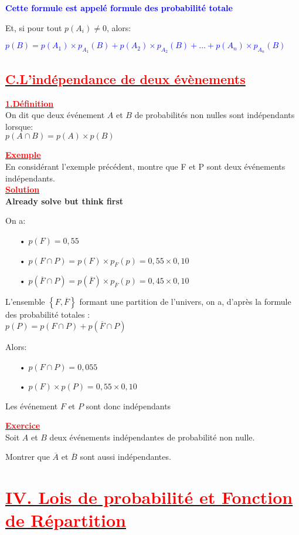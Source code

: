 \documentclass[12pt]{article}
\begin{document}
\textbf{\textcolor{blue}{Cette formule est appelé formule des probabilité totale}}

Et, si pour tout $p(A_{i}) \neq 0$, alors:

\textcolor{blue}{$p(B)=p(A_{1})\times p_{A_{1}}(B)+p(A_{2})\times p_{A_{2}}(B)+...+p(A_{n})\times p_{A_{n}}(B)$}
\subsection*{\underline{\textbf{\textcolor{red}{C.L'indépendance de deux évènements}}}}
\underline{\textbf{\textcolor{red}{1.Définition}}}\\
On dit que deux événement $A$ et $B$ de probabilités non nulles sont indépendants lorsque:\\
$p(A\cap B)=p(A)\times p(B)$

\underline{\textbf{\textcolor{red}{Exemple}}}\\
En considérant l'exemple précédent, montre que F et P sont deux événements indépendants.\\
\underline{\textbf{\textcolor{red}{Solution}}}\\
\textbf{Already solve but think first}

On a:
\begin{itemize}
\item[•]$p(F)=0,55$
\item[•] $p(F\cap P)=p(F)\times p_{F}(p)=0,55\times 0,10 $
\item[•] $p(\overline{F}\cap P)=p(\overline{F})\times p_{\overline{F}}(p)=0,45\times 0,10$
\end{itemize}
L'ensemble $\left\lbrace F, \overline{F} \right\rbrace $ formant une partition de l'univers, on a, d'après la formule des probabilité totales :\\
$p(P)=p(F\cap P)+p(\overline{F}\cap P)$

Alors:
\begin{itemize}
\item[•] $p(F\cap P)=0,055$
\item[•] $p(F)\times p(P)=0,55\times 0,10$
\end{itemize}
Les événement $F$ et $P$ sont donc indépendants

\underline{\textbf{\textcolor{red}{Exercice}}}\\
Soit $A$ et $B$ deux événements indépendantes de probabilité non nulle.

Montrer que $\overline{A}$ et $\overline{B}$ sont aussi indépendantes.
\section*{\underline{\textbf{\textcolor{red}{IV. Lois de probabilité et Fonction de Répartition}}}}
\end{document}
